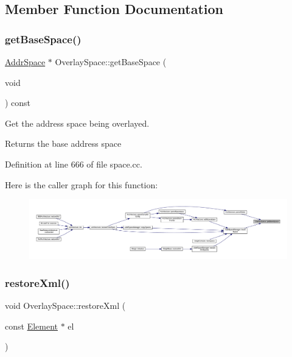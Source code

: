 \subsection{Member Function Documentation}
\mbox{\label{class_overlay_space_a3a9afed136f872a975743f173f896689}} 
\subsubsection{\texorpdfstring{getBaseSpace()}{getBaseSpace()}}
{\footnotesize\ttfamily \mbox{\hyperlink{class_addr_space}{Addr\+Space}} $\ast$ Overlay\+Space\+::get\+Base\+Space (\begin{DoxyParamCaption}\item[{void}]{ }\end{DoxyParamCaption}) const}



Get the address space being overlayed. 

\begin{DoxyReturn}{Returns}
the base address space 
\end{DoxyReturn}


Definition at line 666 of file space.\+cc.

Here is the caller graph for this function\+:
\nopagebreak
\begin{figure}[H]
\begin{center}
\leavevmode
\includegraphics[width=350pt]{class_overlay_space_a3a9afed136f872a975743f173f896689_icgraph}
\end{center}
\end{figure}
\mbox{\label{class_overlay_space_ac954d7e1ddb57d0f811b4200bd0deee2}} 
\subsubsection{\texorpdfstring{restoreXml()}{restoreXml()}}
{\footnotesize\ttfamily void Overlay\+Space\+::restore\+Xml (\begin{DoxyParamCaption}\item[{const \mbox{\hyperlink{class_element}{Element}} $\ast$}]{el }\end{DoxyParamCaption})\hspace{0.3cm}{\ttfamily [virtual]}}



